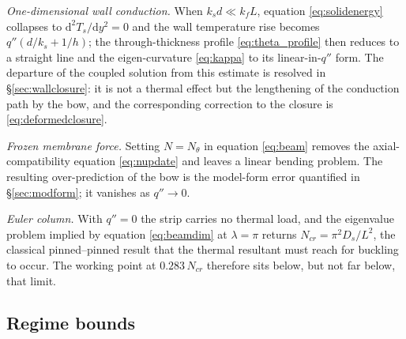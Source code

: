 \documentclass[11pt,a4paper]{article}
\newcommand{\dd}{\mathrm{d}}
\begin{document}
\emph{One-dimensional wall conduction.} When $k_s d\ll k_f L$, equation
\eqref{eq:solidenergy} collapses to $\dd^2T_s/\dd y^2=0$ and the wall
temperature rise becomes $q''(d/k_s+1/h)$; the through-thickness profile
\eqref{eq:theta_profile} then reduces to a straight line and the eigen-curvature
\eqref{eq:kappa} to its linear-in-$q''$ form. The departure of the coupled
solution from this estimate is resolved in \S\ref{sec:wallclosure}: it is not a thermal effect
but the lengthening of the conduction path by the bow, and the corresponding correction to the
closure is \eqref{eq:deformedclosure}.

\emph{Frozen membrane force.} Setting $N=N_\theta$ in equation
\eqref{eq:beam} removes the axial-compatibility equation \eqref{eq:nupdate} and
leaves a linear bending problem. The resulting over-prediction of the bow is the
model-form error quantified in \S\ref{sec:modform}; it vanishes as $q''\to0$.

\emph{Euler column.} With $q''=0$ the strip carries no thermal load, and the
eigenvalue problem implied by equation \eqref{eq:beamdim} at $\lambda=\pi$
returns $N_{cr}=\pi^2D_s/L^2$, the classical pinned--pinned result that the
thermal resultant must reach for buckling to occur. The working point at
$0.283\,N_{cr}$ therefore sits below, but not far below, that limit.

\subsection{Regime bounds}
\label{sec:bounds}
\end{document}
